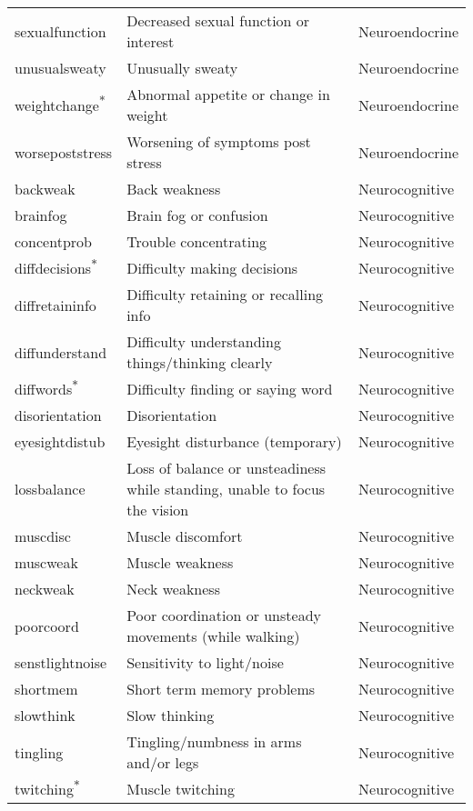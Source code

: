 \begin{tabular}{lll}
sexualfunction    & Decreased sexual function or interest & Neuroendocrine \\
unusualsweaty     & Unusually sweaty & Neuroendocrine \\
weightchange\textsuperscript{${\ast}$}  & Abnormal appetite or change in weight & Neuroendocrine \\
worsepoststress   & Worsening of symptoms post stress & Neuroendocrine \\
backweak        & Back weakness & Neurocognitive \\
brainfog        & Brain fog or confusion & Neurocognitive \\
concentprob     & Trouble concentrating & Neurocognitive \\
diffdecisions\textsuperscript{${\ast}$}  & Difficulty making decisions & Neurocognitive \\
diffretaininfo  & Difficulty retaining or recalling info & Neurocognitive \\
diffunderstand  & Difficulty understanding things/thinking clearly & Neurocognitive \\
diffwords\textsuperscript{${\ast}$}   & Difficulty finding or saying word & Neurocognitive \\
disorientation  & Disorientation & Neurocognitive \\
eyesightdistub  & Eyesight disturbance (temporary) & Neurocognitive \\
lossbalance     & Loss of balance or unsteadiness while standing, unable to focus the vision & Neurocognitive \\
muscdisc        & Muscle discomfort & Neurocognitive \\
muscweak        & Muscle weakness & Neurocognitive \\
neckweak        & Neck weakness & Neurocognitive \\
poorcoord       & Poor coordination or unsteady movements (while walking) & Neurocognitive \\
senstlightnoise & Sensitivity to light/noise & Neurocognitive \\
shortmem        & Short term memory problems & Neurocognitive \\
slowthink       & Slow thinking & Neurocognitive \\
tingling        & Tingling/numbness in arms and/or legs & Neurocognitive \\
twitching\textsuperscript{${\ast}$}   & Muscle twitching & Neurocognitive \\

\end{tabular}
